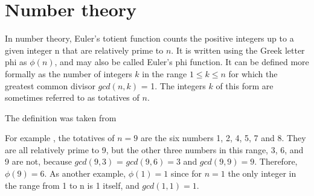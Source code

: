 \begin{appendices}
\begin{definition}
\end{definition}

\section{Number theory}

\begin{definition}
  In number theory, Euler's totient function counts the positive
  integers up to a given integer n that are relatively prime to $n$. It
  is written using the Greek letter phi as $\phi\left(n\right)$, and
  may also be called Euler's phi function. It can be defined more formally as
  the number of integers $k$ in the range $1 \le k \le n$ for which the
  greatest common divisor $gcd\left(n, k\right)$ = 1. The integers $k$ of this
  form are sometimes referred to as totatives of $n$.

  The definition was taken from \cite{wiki:eulerfunction}
  \label{def:eulerfuction}
\end{definition}

\begin{example}
  For example \cite{wiki:eulerfunction}, the totatives of $n = 9$ are
  the six numbers 1, 2, 4, 5, 
  7 and 8. They are all relatively prime to 9, but the other three
  numbers in this range, 3, 6, and 9 are not, because
  $gcd\left(9, 3\right)$ =
  $gcd\left(9, 6\right) = 3$ and $gcd\left(9, 9\right) = 9$.
  Therefore, $\phi\left(9\right) = 6$. As another
  example, $\phi\left(1\right) = 1$ since for $n = 1$ the only integer in the range from
  1 to n is 1 itself, and $gcd\left(1, 1\right) = 1$. 
\end{example}

\end{appendices}
